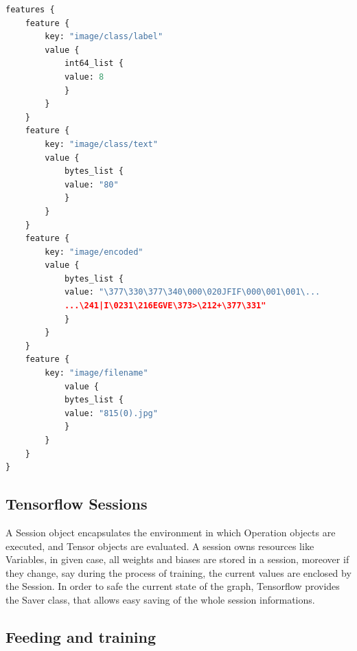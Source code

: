 \begin{minipage}{\linewidth}
\begin{lstlisting}[language=python, caption={Minimized Excerpt of a  TFRecord file}, label={lst:tfrecord},captionpos=b]
features {
	feature {
		key: "image/class/label"
		value {
			int64_list {
			value: 8
			}
		}
	}
	feature {
		key: "image/class/text"
		value {
			bytes_list {
			value: "80"
			}
		}
	}
	feature {
		key: "image/encoded"
		value {
			bytes_list {
			value: "\377\330\377\340\000\020JFIF\000\001\001\...
			...\241|I\0231\216EGVE\373>\212+\377\331"
			}
		}
	}
	feature {
		key: "image/filename"
			value {
			bytes_list {
			value: "815(0).jpg"
			}
		}
	}
}

\end{lstlisting}
\end{minipage}

\subsection{Tensorflow Sessions}
A Session object encapsulates the environment in which Operation objects are executed, and Tensor objects are evaluated\cite{tensorflowsession}. A session owns resources like Variables, in given case, all weights and biases are stored in a session, moreover if they change, say during the process of training, the current values are enclosed by the Session. In order to safe the current state of the graph, Tensorflow provides the Saver class, that allows easy saving of the whole session informations. 

\subsection{Feeding and training}


